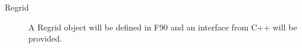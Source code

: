 

\begin{description}

\item [Regrid] A Regrid object will be defined in F90 and an interface
from C++ will be provided.

\end{description}



